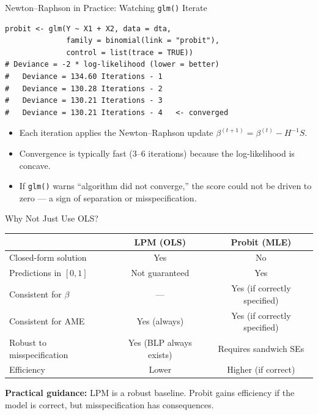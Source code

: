 \documentclass[aspectratio=169, handout, t]{beamer}
\numberwithin{equation}{section}
\begin{document}

\begin{frame}[fragile]{Newton--Raphson in Practice: Watching \texttt{glm()} Iterate}

\begin{lstlisting}
probit <- glm(Y ~ X1 + X2, data = dta,
              family = binomial(link = "probit"),
              control = list(trace = TRUE))
# Deviance = -2 * log-likelihood (lower = better)
#   Deviance = 134.60 Iterations - 1
#   Deviance = 130.28 Iterations - 2
#   Deviance = 130.21 Iterations - 3
#   Deviance = 130.21 Iterations - 4   <- converged
\end{lstlisting}\pause

\begin{itemize}
\item Each iteration applies the Newton--Raphson update $\beta^{(t+1)} = \beta^{(t)} - H^{-1}S$.\pause
\item Convergence is typically fast (3--6 iterations) because the log-likelihood is concave.\pause
\item If \texttt{glm()} warns ``algorithm did not converge,'' the score could not be driven to zero --- a sign of separation or misspecification.
\end{itemize}

\end{frame}


\begin{frame}{Why Not Just Use OLS?}

\begin{center}
\renewcommand{\arraystretch}{1.3}
\small
\begin{tabular}{lcc}
\toprule
& \textbf{LPM (OLS)} & \textbf{Probit (MLE)} \\
\midrule
Closed-form solution & Yes & No \\
Predictions in $[0,1]$ & Not guaranteed & Yes \\
Consistent for $\beta$ & --- & Yes (if correctly specified) \\
Consistent for AME & Yes (always) & Yes (if correctly specified) \\
Robust to misspecification & Yes (BLP always exists) & Requires sandwich SEs \\
Efficiency & Lower & Higher (if correct) \\
\bottomrule
\end{tabular}
\renewcommand{\arraystretch}{1.0}
\normalsize
\end{center}

\pause

\begin{tcolorbox}[colback=blue!5, colframe=blue!50, boxsep=2pt, top=2pt, bottom=2pt]
\textbf{Practical guidance:} LPM is a robust baseline. Probit gains efficiency if the model is correct, but misspecification has consequences.
\end{tcolorbox}

\end{frame}
\end{document}
